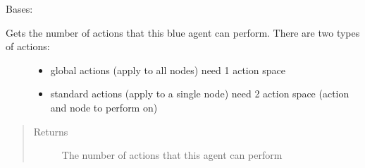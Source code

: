 \documentclass[letterpaper,10pt,english]{sphinxmanual}
\begin{document}
\begin{fulllineitems}
\label{\detokenize{source/yawning_titan.envs.generic.core:yawning_titan.envs.generic.core.blue_interface.BlueInterface}}
\sphinxAtStartPar
Bases: {\hyperref[\detokenize{source/yawning_titan.envs.generic.core:yawning_titan.envs.generic.core.blue_action_set.BlueActionSet}]{}}

\begin{fulllineitems}
\label{\detokenize{source/yawning_titan.envs.generic.core:yawning_titan.envs.generic.core.blue_interface.BlueInterface.get_number_of_actions}}\begin{description}
\item[{Gets the number of actions that this blue agent can perform. There are two types of actions:}] \leavevmode\begin{itemize}
\item {}
\sphinxAtStartPar
global actions (apply to all nodes) \sphinxhyphen{} need 1 action space

\item {}
\sphinxAtStartPar
standard actions (apply to a single node) \sphinxhyphen{} need 2 action space (action and node to perform on)

\end{itemize}

\end{description}
\begin{quote}\begin{description}
\item[{Returns}] \leavevmode
\sphinxAtStartPar
The number of actions that this agent can perform


\end{description}
\end{quote}
\end{fulllineitems}
\end{fulllineitems}
\end{document}
